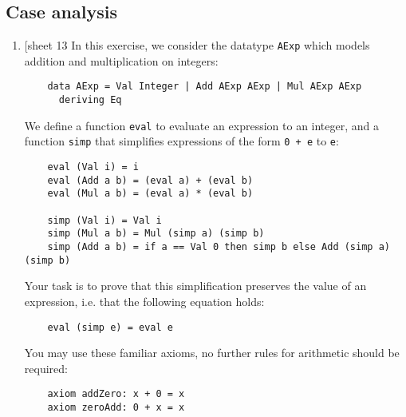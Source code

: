 \documentclass{article}
\def\code#1{\texttt{#1}}
\begin{document}
\subsection{Case analysis}
\begin{enumerate}
    \item {[sheet 13} In this exercise, we consider the datatype \code{AExp} which models addition and multiplication on integers:
        \begin{verbatim}
    data AExp = Val Integer | Add AExp AExp | Mul AExp AExp
      deriving Eq
        \end{verbatim}
        We define a function \code{eval} to evaluate an expression to an integer, and a function \code{simp} that simplifies expressions of the form \code{0 + e} to \code{e}:
        \begin{verbatim}
    eval (Val i) = i
    eval (Add a b) = (eval a) + (eval b)
    eval (Mul a b) = (eval a) * (eval b)

    simp (Val i) = Val i
    simp (Mul a b) = Mul (simp a) (simp b)
    simp (Add a b) = if a == Val 0 then simp b else Add (simp a) (simp b)
        \end{verbatim}
        Your task is to prove that this simplification preserves the value of an expression, i.e. that the following equation holds:
        \begin{verbatim}
    eval (simp e) = eval e
        \end{verbatim}
        You may use these familiar axioms, no further rules for arithmetic should be required:
        \begin{verbatim}
    axiom addZero: x + 0 = x
    axiom zeroAdd: 0 + x = x
        \end{verbatim}
\end{enumerate}
\end{document}
